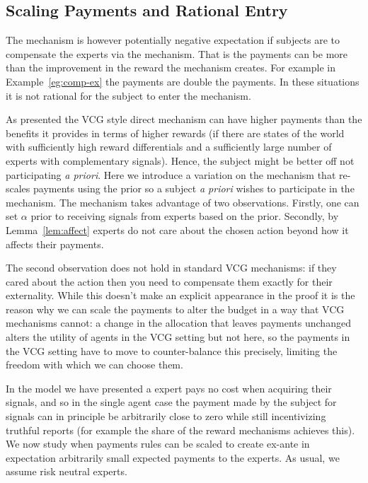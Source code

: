 \subsection{Scaling Payments and Rational Entry}

The mechanism is however potentially negative expectation if subjects are to compensate the experts via the mechanism.  
That is the payments can be more than the improvement in the reward the mechanism creates. For example in Example~\ref{eg:comp-ex} the payments are double the payments. In these situations it is not rational for the subject to enter the mechanism.


As presented the VCG style direct mechanism can have higher payments than the benefits it provides in terms of higher rewards (if there are states of the world with sufficiently high reward differentials and a sufficiently large number of experts with complementary signals). Hence, the subject might be better off not participating \emph{a priori}. Here we introduce a variation on the mechanism that re-scales payments using the prior so a subject \emph{a priori} wishes to participate in the mechanism. The mechanism takes advantage of two observations. Firstly, one can set $\alpha$ prior to receiving signals from experts based on the prior. Secondly, by Lemma~\ref{lem:affect} experts do not care about the chosen action beyond how it affects their payments. 

The second observation does not hold in standard VCG mechanisms: if they cared about the action then you need to compensate them exactly for their externality. While this doesn't make an explicit appearance in the proof it is the reason why we can scale the payments to alter the budget in a way that VCG mechanisms cannot: a change in the allocation that leaves payments unchanged alters the utility of agents in the VCG setting but not here, so the payments in the VCG setting have to move to counter-balance this precisely, limiting the freedom with which we can choose them.


In the model we have presented a expert pays no cost when acquiring their signals, and so in the single agent case the payment made by the subject for signals can in principle be arbitrarily close to zero while still incentivizing truthful reports (for example the share of the reward mechanisms achieves this). We now study when payments rules can be scaled to create ex-ante in expectation arbitrarily small expected payments to the experts. As usual, we assume risk neutral experts. 


